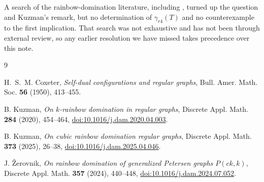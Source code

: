 \documentclass[11pt]{amsart}
\begin{document}
A search of the rainbow-domination literature, including
\cite{Kuzman2020,Kuzman2025,Zerovnik2024}, turned up the question and
Kuzman's remark, but no determination of $\gamma_{r4}(T)$ and no
counterexample to the first implication. That search was not exhaustive
and has not been through external review, so any earlier resolution we
have missed takes precedence over this note.

\begin{thebibliography}{9}

H.~S.~M. Coxeter,
\emph{Self-dual configurations and regular graphs},
Bull. Amer. Math. Soc. \textbf{56} (1950), 413--455.

B. Kuzman,
\emph{On $k$-rainbow domination in regular graphs},
Discrete Appl. Math. \textbf{284} (2020), 454--464,
\href{https://doi.org/10.1016/j.dam.2020.04.003}
{doi:10.1016/j.dam.2020.04.003}.

B. Kuzman,
\emph{On cubic rainbow domination regular graphs},
Discrete Appl. Math. \textbf{373} (2025), 26--38,
\href{https://doi.org/10.1016/j.dam.2025.04.046}
{doi:10.1016/j.dam.2025.04.046}.

J. \v{Z}erovnik,
\emph{On rainbow domination of generalized Petersen graphs $P(ck,k)$},
Discrete Appl. Math. \textbf{357} (2024), 440--448,
\href{https://doi.org/10.1016/j.dam.2024.07.052}
{doi:10.1016/j.dam.2024.07.052}.

\end{thebibliography}
\end{document}
